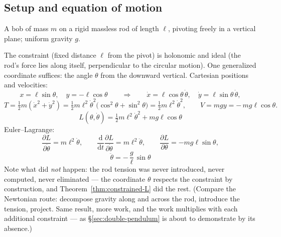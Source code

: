 \documentclass[11pt]{article}
\theoremstyle{plain}
\theoremstyle{definition}
\theoremstyle{remark}
\newcommand{\dd}{\mathrm{d}}
\newcommand{\pd}[2]{\frac{\partial #1}{\partial #2}}
\begin{document}
\subsection{Setup and equation of motion}

A bob of mass $m$ on a rigid massless rod of length $\ell$, pivoting
freely in a vertical plane; uniform gravity $g$.

\begin{center}
\end{center}

The constraint (fixed distance $\ell$ from the pivot) is holonomic and
ideal (the rod's force lies along itself, perpendicular to the circular
motion). One generalized coordinate suffices: the angle $\theta$ from the
downward vertical. Cartesian positions and velocities:
\begin{equation}
  x = \ell\sin\theta,\quad y = -\ell\cos\theta
  \qquad\Longrightarrow\qquad
  \dot x = \ell\cos\theta\,\dot\theta,\quad
  \dot y = \ell\sin\theta\,\dot\theta,
\end{equation}
\begin{equation}
  T = \tfrac12 m(\dot x^2 + \dot y^2)
    = \tfrac12 m\ell^2\dot\theta^2
    \bigl(\cos^2\theta + \sin^2\theta\bigr)
    = \tfrac12 m \ell^2 \dot\theta^2,
  \qquad
  V = mgy = -\,mg\ell\cos\theta .
\end{equation}
\begin{equation}
  \boxed{\;
  L(\theta, \dot\theta)
  = \tfrac12 m\ell^2\dot\theta^2 + mg\ell\cos\theta
  \;}
\end{equation}
Euler--Lagrange:
\begin{equation}
  \pd{L}{\dot\theta} = m\ell^2\dot\theta,
  \qquad
  \frac{\dd}{\dd t}\pd{L}{\dot\theta} = m\ell^2\ddot\theta,
  \qquad
  \pd{L}{\theta} = -mg\ell\sin\theta ,
\end{equation}
\begin{equation}
  \boxed{\;
  \ddot\theta = -\,\frac{g}{\ell}\,\sin\theta
  \;}
  \label{eq:pendulum-eom}
\end{equation}
Note what did \emph{not} happen: the rod tension was never introduced,
never computed, never eliminated --- the coordinate $\theta$ respects the
constraint by construction, and Theorem~\ref{thm:constrained-L} did the
rest. (Compare the Newtonian route: decompose gravity along and across the
rod, introduce the tension, project. Same result, more work, and
the work multiplies with each additional constraint --- as
\S\ref{sec:double-pendulum} is about to demonstrate by its absence.)
\end{document}
